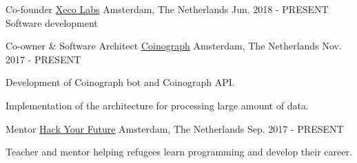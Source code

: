 

\begin{cventries}

  \cventry
    {Co-founder} %
    {\href{https://www.xecolabs.com}{Xeco Labs}} %
    {Amsterdam, The Netherlands} %
    {Jun. 2018 - PRESENT} %
    {Software development}

  \cventry
    {Co-owner \& Software Architect} %
    {\href{https://www.coinograph.io}{Coinograph}} %
    {Amsterdam, The Netherlands} %
    {Nov. 2017 - PRESENT} %
    {
      \begin{cvitems} %
      \item {Development of Coinograph bot and Coinograph API.}
      \item {Implementation of the architecture for processing large amount of data.}
      \end{cvitems}
    }
  \cventry
    {Mentor} %
    {\href{https://www.hackyourfuture.net}{Hack Your Future}} %
    {Amsterdam, The Netherlands} %
    {Sep. 2017 - PRESENT} %
    {
      \begin{cvitems} %
      \item {Teacher and mentor helping refugees learn programming and develop their career.}
      \end{cvitems}
    }


\end{cventries}
